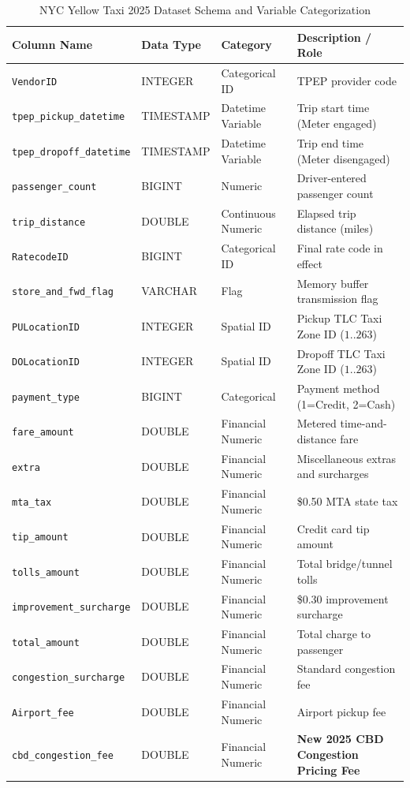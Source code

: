\documentclass[11pt,a4paper]{article}
\begin{document}
\begin{table}[htbp]
\centering
\caption{NYC Yellow Taxi 2025 Dataset Schema and Variable Categorization}
\label{tab:schema}
\small
\begin{tabularx}{\textwidth}{llXX}
\toprule
\textbf{Column Name} & \textbf{Data Type} & \textbf{Category} & \textbf{Description / Role} \\
\midrule
\texttt{VendorID} & INTEGER & Categorical ID & TPEP provider code \\
\texttt{tpep\_pickup\_datetime} & TIMESTAMP & Datetime Variable & Trip start time (Meter engaged) \\
\texttt{tpep\_dropoff\_datetime} & TIMESTAMP & Datetime Variable & Trip end time (Meter disengaged) \\
\texttt{passenger\_count} & BIGINT & Numeric & Driver-entered passenger count \\
\texttt{trip\_distance} & DOUBLE & Continuous Numeric & Elapsed trip distance (miles) \\
\texttt{RatecodeID} & BIGINT & Categorical ID & Final rate code in effect \\
\texttt{store\_and\_fwd\_flag} & VARCHAR & Flag & Memory buffer transmission flag \\
\texttt{PULocationID} & INTEGER & Spatial ID & Pickup TLC Taxi Zone ID ($1..263$) \\
\texttt{DOLocationID} & INTEGER & Spatial ID & Dropoff TLC Taxi Zone ID ($1..263$) \\
\texttt{payment\_type} & BIGINT & Categorical & Payment method (1=Credit, 2=Cash) \\
\texttt{fare\_amount} & DOUBLE & Financial Numeric & Metered time-and-distance fare \\
\texttt{extra} & DOUBLE & Financial Numeric & Miscellaneous extras and surcharges \\
\texttt{mta\_tax} & DOUBLE & Financial Numeric & \$0.50 MTA state tax \\
\texttt{tip\_amount} & DOUBLE & Financial Numeric & Credit card tip amount \\
\texttt{tolls\_amount} & DOUBLE & Financial Numeric & Total bridge/tunnel tolls \\
\texttt{improvement\_surcharge} & DOUBLE & Financial Numeric & \$0.30 improvement surcharge \\
\texttt{total\_amount} & DOUBLE & Financial Numeric & Total charge to passenger \\
\texttt{congestion\_surcharge} & DOUBLE & Financial Numeric & Standard congestion fee \\
\texttt{Airport\_fee} & DOUBLE & Financial Numeric & Airport pickup fee \\
\texttt{cbd\_congestion\_fee} & DOUBLE & Financial Numeric & \textbf{New 2025 CBD Congestion Pricing Fee} \\
\bottomrule
\end{tabularx}
\end{table}
\end{document}
